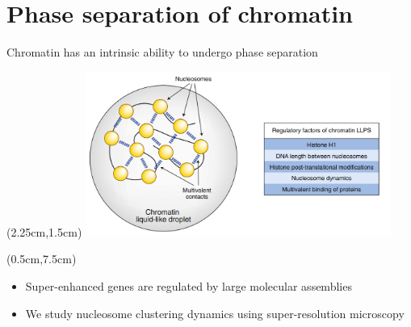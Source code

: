 \documentclass{beamer}					%
\begin{document}
\section{Phase separation of chromatin}
\begin{frame}{Chromatin has an intrinsic ability to undergo phase separation}

\begin{textblock*}{10cm}(2.25cm,1.5cm)
\includegraphics[width=10cm]{ChromatinLLPS.png}
\end{textblock*}


\begin{textblock*}{14cm}(0.5cm,7.5cm)
\begin{itemize}
\item Super-enhanced genes are regulated by large molecular assemblies
\item We study nucleosome clustering dynamics using super-resolution microscopy
\end{itemize}
\end{textblock*}

\end{frame}
\end{document}
